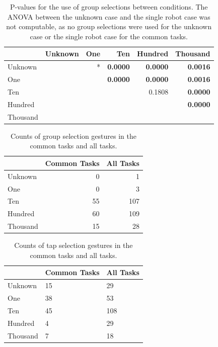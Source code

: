 \begin{table}
\centering
	\begin{tabular}{l|r r r r r }
		& Unknown & One    & Ten        & Hundred     & Thousand   \\ 
		\hline
		Unknown & & * & \textbf{0.0000} & \textbf{0.0000} & \textbf{0.0016} \\   
		One & & & \textbf{0.0000} & \textbf{0.0000} & \textbf{0.0016} \\
		Ten & & & & 0.1808 & \textbf{0.0000}   \\
		Hundred & & & & & \textbf{0.0000}   \\
		Thousand & & & & &\\
	\end{tabular}
	\caption{P-values for the use of group selections between conditions. The ANOVA between the unknown case and the single robot case was not computable, as no group selections were used for the unknown case or the single robot case for the common tasks.}
	\label{tab:group_select_per_task_norm}
\end{table}

\begin{table}
	\centering
	\begin{tabular}{l | r r }
		& Common Tasks & All Tasks\\
		\hline
		Unknown & 0 & 1\\
		One & 0 & 3\\
		Ten & 55 & 107 \\
		Hundred & 60 & 109\\
		Thousand & 15 & 28\\
	\end{tabular}
	\caption{Counts of group selection gestures in the common tasks and all tasks.}
	\label{tab:group_raw_counts}
\end{table}

\begin{table}
	\centering
	\begin{tabular}{l | l l}
		& Common Tasks & All Tasks\\
		\hline
		Unknown & 15 & 29\\
		One & 38 & 53 \\
		Ten & 45 & 108\\
		Hundred & 4 & 29 \\
		Thousand & 7 & 18\\
	\end{tabular}
	\caption{Counts of tap selection gestures in the common tasks and all tasks.}
	\label{tab:tap_raw_counts}
\end{table}

